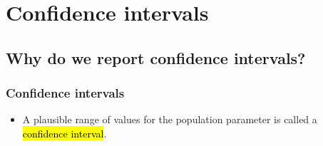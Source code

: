 \section{Confidence intervals}


\subsection{Why do we report confidence intervals?}


\begin{frame}[shrink]
\frametitle{Confidence intervals}

\begin{itemize}

\item A plausible range of values for the population parameter is called a \hl{confidence interval}.


\end{itemize}
\end{frame}
